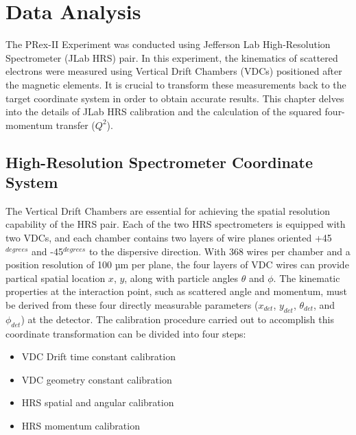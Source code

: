 \chapter{Data Analysis}

The PRex-II Experiment was conducted using  Jefferson Lab High-Resolution Spectrometer (JLab HRS) pair. In this experiment, the kinematics of scattered electrons were measured using Vertical Drift Chambers (VDCs) positioned after the magnetic elements. It is crucial to transform these measurements back to the target coordinate system in order to obtain accurate results. This chapter delves into the details of JLab HRS calibration and the calculation of the squared four-momentum transfer ($Q^2$).

\section{High-Resolution Spectrometer Coordinate System}

The Vertical Drift Chambers are essential for achieving the spatial resolution capability of the HRS pair. Each of the two HRS spectrometers is equipped with two VDCs, and each chamber contains two layers of wire planes oriented  +45$^{degrees}$ and -45$^{degrees}$ to the dispersive direction. With 368 wires per chamber and a position resolution of 100 µm per plane, the four layers of VDC  wires can provide partical spatial location $x$, $y$, along with particle angles $\theta$ and $\phi$. The kinematic properties at the interaction point, such as scattered angle and momentum, must be derived from these four directly measurable parameters ($x_{det}$, $y_{det}$, $\theta_{det}$, and $\phi_{det}$) at the detector. The calibration procedure carried out to accomplish this coordinate transformation can be divided into four steps:

\begin{itemize}
\item VDC Drift time constant calibration
\item VDC geometry constant calibration
\item HRS spatial and angular calibration
\item HRS momentum calibration
\end{itemize}

